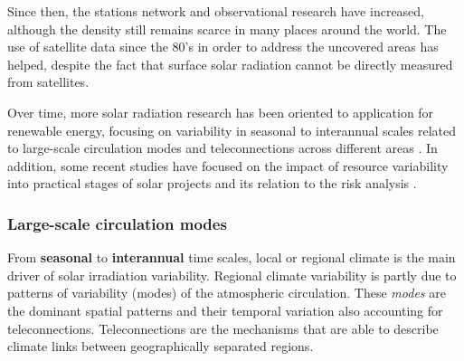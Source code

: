 Since then, the stations network and observational research have increased, although the density still remains scarce in many places around the world. The use of satellite data since the 80's in order to address the uncovered areas has helped, despite the fact that surface solar radiation cannot be directly measured from satellites.  

Over time, more solar radiation research has been oriented to application for renewable energy, focusing on variability in seasonal to interannual scales related to large-scale circulation modes and teleconnections across different areas \cite*{Davy2012, Jerez2013, Jerez2013a}.  In addition, some recent studies have focused on the impact of resource variability into practical stages of solar projects and its relation to the risk analysis \cite*{Bryce2018}.


\subsubsection{Large-scale circulation modes}

From \textbf{seasonal} to \textbf{interannual} time scales, local or regional climate is the main driver of solar irradiation variability. Regional climate variability is partly due to patterns of variability (modes) of the atmospheric circulation. These \textit{modes} are the dominant spatial patterns and their temporal variation also accounting for teleconnections. Teleconnections are the mechanisms that are able to describe climate links between geographically separated regions. %


